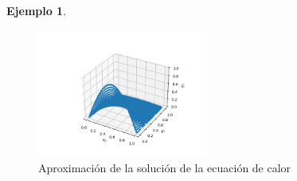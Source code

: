 \documentclass[a4paper,11pt,spanish, twoside, leqno]{tfg-uam}
\theoremstyle{definition}
\newtheorem{exmp}[teor]{Ejemplo}
\begin{document}
\begin{mdframed}
\begin{exmp}
\begin{figure}[H]
            \centering
            \includegraphics[width=0.5\textwidth]{Figuras/calor_estimacion.png}
            \caption{Aproximación de la solución de la ecuación de calor}
            \label{fig:calor_estimacion}
        \end{figure}

    \end{exmp}
\end{mdframed}
\end{document}
